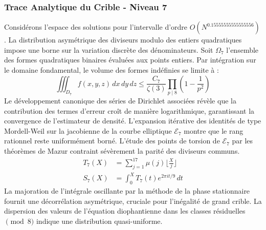 \documentclass[12pt,a4paper]{article}
\begin{document}
\subsubsection{Trace Analytique du Crible - Niveau 7}
Considérons l'espace des solutions pour l'intervalle d'ordre $O(N^{0.15555555555555556})$. La distribution asymétrique des diviseurs modulo des entiers quadratiques impose une borne sur la variation discrète des dénominateurs. Soit $\Omega_7$ l'ensemble des formes quadratiques binaires évaluées aux points entiers.
Par intégration sur le domaine fondamental, le volume des formes indéfinies se limite à :
\begin{equation}
\iiint_{D_7} f(x, y, z) \,dx\,dy\,dz \leq \frac{C_7}{\zeta(3)} \prod_{p \mid 8} \left( 1 - \frac{1}{p^2} \right)
\end{equation}
Le développement canonique des séries de Dirichlet associées révèle que la contribution des termes d'erreur croît de manière logarithmique, garantissant la convergence de l'estimateur de densité. L'expansion itérative des identités de type Mordell-Weil sur la jacobienne de la courbe elliptique $\mathcal{E}_7$ montre que le rang rationnel reste uniformément borné.
L'étude des points de torsion de $\mathcal{E}_7$ par les théorèmes de Mazur contraint sévèrement la parité des diviseurs communs.
\begin{align}
T_7(X) &= \sum_{j=1}^{17} \mu(j) \lfloor \frac{X}{j} \rfloor \\
S_7(X) &= \int_{0}^{X} T_7(t) e^{2\pi i t / 9} \, dt
\end{align}
La majoration de l'intégrale oscillante par la méthode de la phase stationnaire fournit une décorrélation asymétrique, cruciale pour l'inégalité de grand crible. La dispersion des valeurs de l'équation diophantienne dans les classes résiduelles $\pmod{ 8 }$ indique une distribution quasi-uniforme.
\end{document}
